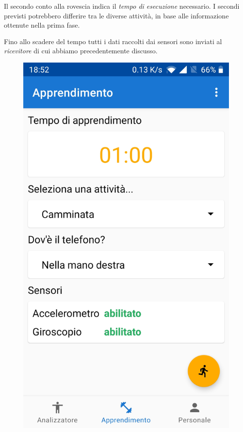 Il secondo conto alla rovescia indica il \textit{tempo di esecuzione} necessario. I secondi previsti potrebbero differire tra le diverse attività, 
in base alle informazione ottenute nella prima fase. 

Fino allo scadere del tempo tutti i dati raccolti dai sensori sono inviati al \textit{ricevitore} di cui abbiamo precedentemente discusso.

\begin{figure}[H]
    \centering
    \includegraphics[scale = 0.1019]{assets/images/screenshots/2a_Init.jpg}

\end{figure}
